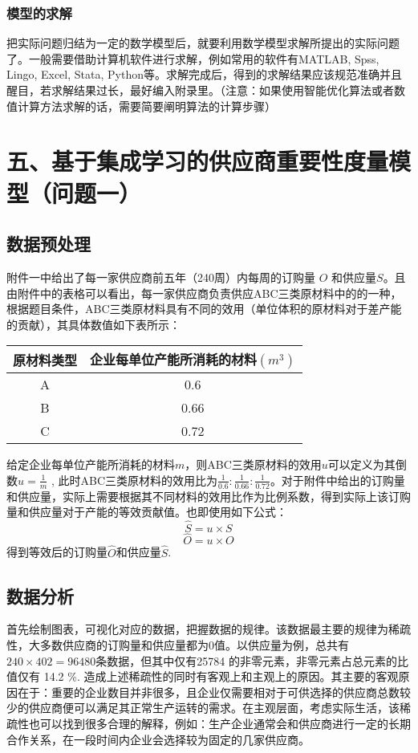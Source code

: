 \documentclass{my_paper}
\begin{document}
\subsubsection{模型的求解}
把实际问题归结为一定的数学模型后，就要利用数学模型求解所提出的实际问题了。一般需要借助计算机软件进行求解，例如常用的软件有MATLAB, Spss, Lingo, Excel, Stata, Python等。求解完成后，得到的求解结果应该规范准确并且醒目，若求解结果过长，最好编入附录里。（注意：如果使用智能优化算法或者数值计算方法求解的话，需要简要阐明算法的计算步骤）
\fi 

\section{五、基于集成学习的供应商重要性度量模型（问题一）}

\subsection{数据预处理}
附件一中给出了每一家供应商前五年（240周）内每周的订购量 $O$ 和供应量$S$。且由附件中的表格可以看出，每一家供应商负责供应ABC三类原材料中的的一种，根据题目条件，ABC三类原材料具有不同的效用（单位体积的原材料对于差产能的贡献），其具体数值如下表所示：

\begin{table}[h]
\centering
\begin{tabular}{cc}
\hline
    原材料类型 &   企业每单位产能所消耗的材料$(m^3)$ \\
\hline
 A & 0.6 \\
 B & 0.66 \\
 C & 0.72 \\
\end{tabular}
\end{table}

给定企业每单位产能所消耗的材料$m$，则ABC三类原材料的效用$u$可以定义为其倒数$u = \frac{1}{m}$ , 此时ABC三类原材料的效用比为$ \frac{1}{0.6} : \frac{1}{0.66} : \frac{1}{0.72} $。对于附件中给出的订购量和供应量，实际上需要根据其不同材料的效用比作为比例系数，得到实际上该订购量和供应量对于产能的等效贡献值。也即使用如下公式：$$ \hat{S} = u \times S  $$ $$ \hat{O} = u \times O $$
得到等效后的订购量$\hat{O}$和供应量$ \hat{S}$.

\subsection{数据分析}

首先绘制图表，可视化对应的数据，把握数据的规律。该数据最主要的规律为稀疏性，大多数供应商的订购量和供应量都为0值。以供应量为例，总共有$240 \times 402 = 96480$条数据，但其中仅有25784 的非零元素，非零元素占总元素的比值仅有 14.2 \%. 造成上述稀疏性的同时有客观上和主观上的原因。其主要的客观原因在于：重要的企业数目并非很多，且企业仅需要相对于可供选择的供应商总数较少的供应商便可以满足其正常生产运转的需求。在主观层面，考虑实际生活，该稀疏性也可以找到很多合理的解释，例如：生产企业通常会和供应商进行一定的长期合作关系，在一段时间内企业会选择较为固定的几家供应商。
\end{document}
